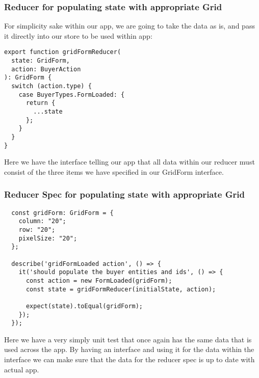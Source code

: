 \subsubsection{ Reducer for populating state with appropriate Grid }
For simplicity sake within our app, we are going to take the data as is, and
pass it directly into our store to be used within app:
\begin{lstlisting}
export function gridFormReducer(
  state: GridForm,
  action: BuyerAction
): GridForm {
  switch (action.type) {
    case BuyerTypes.FormLoaded: {
      return {
        ...state
      };
    }
  }
}
\end{lstlisting}

Here we have the interface telling our app that all data within our reducer
must consist of the three items we have specified in our GridForm interface.

\subsubsection{ Reducer Spec for populating state with appropriate Grid }
\begin{lstlisting}
  const gridForm: GridForm = {
    column: "20";
    row: "20";
    pixelSize: "20";
  };

  describe('gridFormLoaded action', () => {
    it('should populate the buyer entities and ids', () => {
      const action = new FormLoaded(gridForm);
      const state = gridFormReducer(initialState, action);

      expect(state).toEqual(gridForm);
    });
  });
\end{lstlisting}

Here we have a very simply unit test that once again has the same data that is
used across the app. By having an interface and using it for the data within the
interface we can make sure that the data for the reducer spec is up to date with
actual app.
